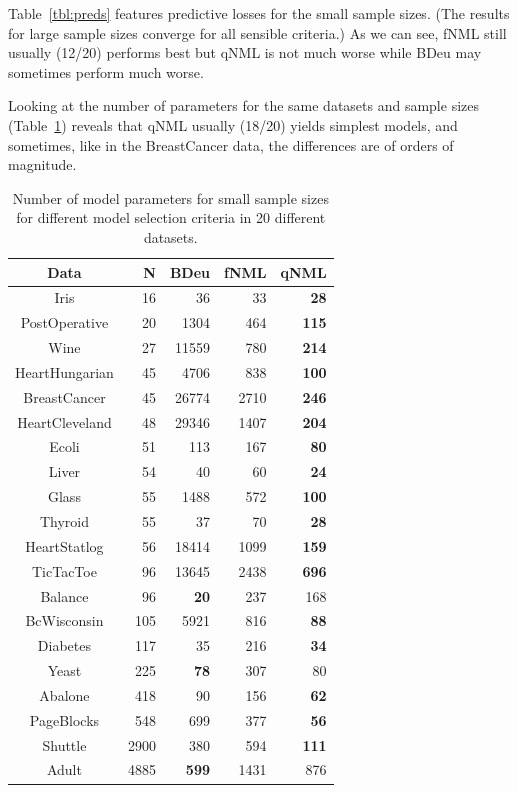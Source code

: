 Table~\ref{tbl:preds} features predictive losses for the small sample
sizes.  (The results for large sample sizes converge for all sensible
criteria.)  As we can see, fNML still usually (12/20) performs best
but qNML is not much worse while BDeu may sometimes perform much
worse.

Looking at the number of parameters for the same datasets and sample
sizes (Table~\ref{tbl:nofparams}) reveals that qNML usually (18/20)
yields simplest models, and sometimes, like in the BreastCancer data,
the differences are of orders of magnitude.

\begin{table}
\centering
\begin{tabular}{crrrr}
\toprule
           Data &     N &          BDeu &  fNML &          qNML \\
\midrule
           Iris &    16 &            36 &    33 &   \textbf{28} \\
  PostOperative &    20 &          1304 &   464 &  \textbf{115} \\
           Wine &    27 &         11559 &   780 &  \textbf{214} \\
 HeartHungarian &    45 &          4706 &   838 &  \textbf{100} \\
   BreastCancer &    45 &         26774 &  2710 &  \textbf{246} \\
 HeartCleveland &    48 &         29346 &  1407 &  \textbf{204} \\
          Ecoli &    51 &           113 &   167 &   \textbf{80} \\
          Liver &    54 &            40 &    60 &   \textbf{24} \\
          Glass &    55 &          1488 &   572 &  \textbf{100} \\
        Thyroid &    55 &            37 &    70 &   \textbf{28} \\
   HeartStatlog &    56 &         18414 &  1099 &  \textbf{159} \\
      TicTacToe &    96 &         13645 &  2438 &  \textbf{696} \\
        Balance &    96 &   \textbf{20} &   237 &           168 \\
    BcWisconsin &   105 &          5921 &   816 &   \textbf{88} \\
       Diabetes &   117 &            35 &   216 &   \textbf{34} \\
          Yeast &   225 &   \textbf{78} &   307 &            80 \\
        Abalone &   418 &            90 &   156 &   \textbf{62} \\
     PageBlocks &   548 &           699 &   377 &   \textbf{56} \\
        Shuttle &  2900 &           380 &   594 &  \textbf{111} \\
          Adult &  4885 &  \textbf{599} &  1431 &           876 \\
\bottomrule
\end{tabular}
\caption{Number of model parameters for small sample sizes for different model selection criteria in 20 different datasets.}
\label{tbl:nofparams}
\end{table}
